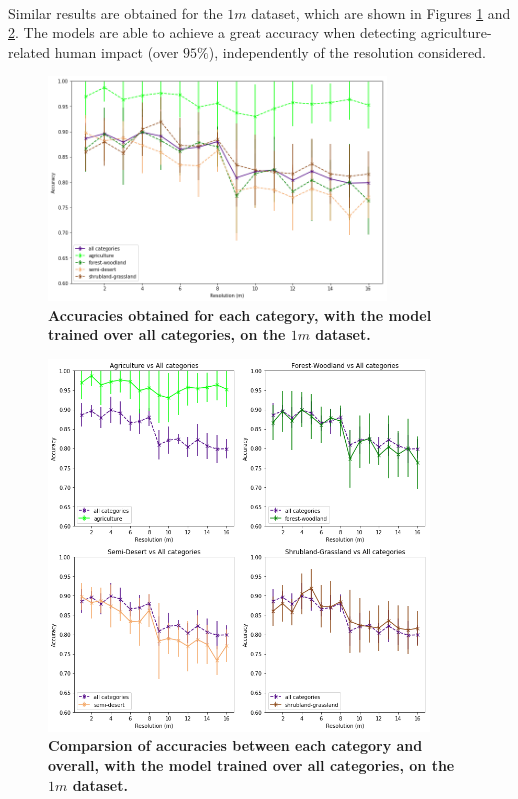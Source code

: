 \

Similar results are obtained for the $1m$ dataset, which are shown in Figures \ref{fig:acc_all_cat_1m} and \ref{fig:acc_by_cat_1m}. The models are able to achieve a great accuracy when detecting agriculture-related human impact (over $95\%$), independently of the resolution considered.

\begin{figure}[H]
	\centering
	\includegraphics[width=0.8\textwidth]{Figures/results/acc_res_all_categories_1m.png}
	\captionsetup{width=1\linewidth}
	\caption{\textbf{Accuracies obtained for each category, with the model trained over all categories, on the $1m$ dataset.}}
	\label{fig:acc_all_cat_1m}
\end{figure}

\begin{figure}[H]
	\centering
	\includegraphics[width=0.9\textwidth]{Figures/results/acc_res_by_category_1m.png}
	\captionsetup{width=1\linewidth}
	\caption{\textbf{Comparsion of accuracies between each category and overall, with the model trained over all categories, on the $1m$ dataset.}}
	\label{fig:acc_by_cat_1m}
\end{figure}


